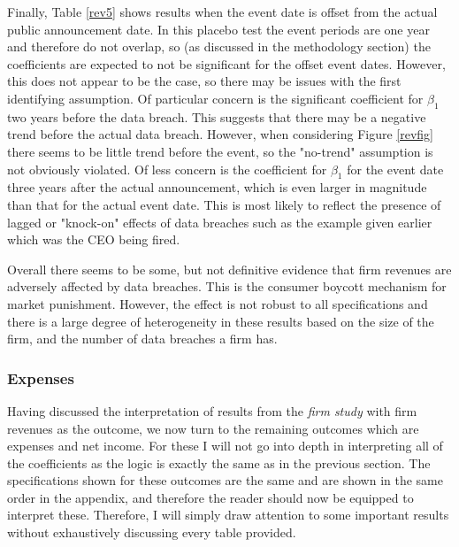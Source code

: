 \documentclass[../Main.tex]{subfiles}
\begin{document}
Finally, Table \ref{rev5} shows results when the event date is offset from the actual public announcement date. In this placebo test the event periods are one year and therefore do not overlap, so (as discussed in the methodology section) the coefficients are expected to not be significant for the offset event dates. However, this does not appear to be the case, so there may be issues with the first identifying assumption. Of particular concern is the significant coefficient for $\beta_1$ two years before the data breach. This suggests that there may be a negative trend before the actual data breach. However, when considering Figure \ref{revfig} there seems to be little trend before the event, so the "no-trend" assumption is not obviously violated. Of less concern is the coefficient for $\beta_1$ for the event date three years after the actual announcement, which is even larger in magnitude than that for the actual event date. This is most likely to reflect the presence of lagged or "knock-on" effects of data breaches such as the example given earlier which was the CEO being fired.

Overall there seems to be some, but not definitive evidence that firm revenues are adversely affected by data breaches. This is the consumer boycott mechanism for market punishment. However, the effect is not robust to all specifications and there is a large degree of heterogeneity in these results based on the size of the firm, and the number of data breaches a firm has.

\subsubsection{Expenses}

Having discussed the interpretation of results from the \textit{firm study} with firm revenues as the outcome, we now turn to the remaining outcomes which are expenses and net income. For these I will not go into depth in interpreting all of the coefficients as the logic is exactly the same as in the previous section. The specifications shown for these outcomes are the same and are shown in the same order in the appendix, and therefore the reader should now be equipped to interpret these. Therefore, I will simply draw attention to some important results without exhaustively discussing every table provided.
\end{document}
